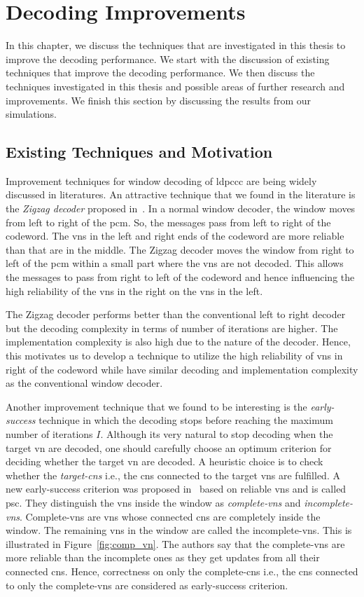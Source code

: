 \chapter{Decoding Improvements}\label{ch:dec_improve}
In this chapter, we discuss the techniques that are investigated in this thesis to improve the decoding performance. We start with the discussion of existing techniques that improve the decoding performance. We then discuss the techniques investigated in this thesis and possible areas of further research and improvements. We finish this section by discussing the results from our simulations.

\section{Existing Techniques and Motivation}
Improvement techniques for window decoding of \ac{ldpccc} are being widely discussed in literatures. An attractive technique that we found in the literature is the \emph{Zigzag decoder} proposed in~\cite{Shadi2015}. In a normal window decoder, the window moves from left to right of the \ac{pcm}. So, the messages pass from left to right of the codeword. The \acp{vn} in the left and right ends of the codeword are more reliable than that are in the middle. The Zigzag decoder moves the window from right to left of the \ac{pcm} within a small part where the \acp{vn} are not decoded. This allows the messages to pass from right to left of the codeword and hence influencing the high reliability of the \acp{vn} in the right on the \acp{vn} in the left.

The Zigzag decoder performs better than the conventional left to right decoder but the decoding complexity in terms of number of iterations are higher. The implementation complexity is also high due to the nature of the decoder. Hence, this motivates us to develop a technique to utilize the high reliability of \acp{vn} in right of the codeword while have similar decoding and implementation complexity as the conventional window decoder.

Another improvement technique that we found to be interesting is the \emph{early-success} technique in which the decoding stops before reaching the maximum number of iterations $I$. Although its very natural to stop decoding when the target \ac{vn} are decoded, one should carefully choose an optimum criterion for deciding whether the target \ac{vn} are decoded. A heuristic choice is to check whether the \emph{target-\acp{cn}} i.e., the \acp{cn} connected to the target \acp{vn} are fulfilled. A new early-success criterion was proposed in~\cite{Kang2018} based on reliable \acp{vn} and is called \ac{psc}. They distinguish the \acp{vn} inside the window as \emph{complete-\acp{vn}} and \emph{incomplete-\acp{vn}}. Complete-\acp{vn} are \acp{vn} whose connected \acp{cn} are completely inside the window. The remaining \acp{vn} in the window are called the incomplete-\acp{vn}. This is illustrated in Figure~\ref{fig:comp_vn}. The authors say that the complete-\acp{vn} are more reliable than the incomplete ones as they get updates from all their connected \acp{cn}. Hence, correctness on only the complete-\acp{cn} i.e., the \acp{cn} connected to only the complete-\acp{vn} are considered as early-success criterion.

